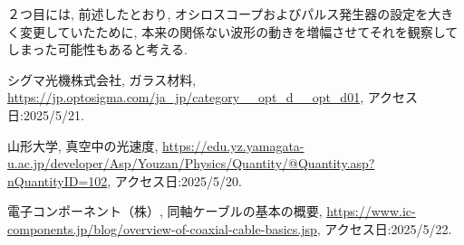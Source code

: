 \documentclass{jarticle}
\begin{document}
２つ目には, 前述したとおり, オシロスコープおよびパルス発生器の設定を大きく変更していたために, 本来の関係ない波形の動きを増幅させてそれを観察してしまった可能性もあると考える.



\begin{thebibliography}{99}

  シグマ光機株式会社, ガラス材料, \url{https://jp.optosigma.com/ja_jp/category__opt_d__opt_d01}, アクセス日:2025/5/21.

  山形大学, 真空中の光速度, \url{https://edu.yz.yamagata-u.ac.jp/developer/Asp/Youzan/Physics/Quantity/@Quantity.asp?nQuantityID=102}, アクセス日:2025/5/20.

  電子コンポーネント（株）, 同軸ケーブルの基本の概要, \url{https://www.ic-components.jp/blog/overview-of-coaxial-cable-basics.jsp}, アクセス日:2025/5/22.

\end{thebibliography}
\end{document}
